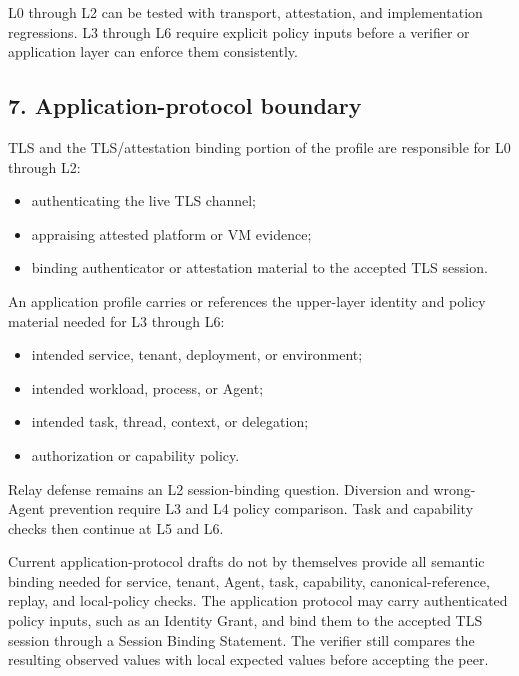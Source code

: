 \documentclass[
]{article}
\providecommand{\tightlist}{%
  \setlength{\itemsep}{0pt}\setlength{\parskip}{0pt}}
\begin{document}
L0 through L2 can be tested with transport, attestation, and
implementation regressions. L3 through L6 require explicit policy inputs
before a verifier or application layer can enforce them consistently.

\subsection{7. Application-protocol
boundary}\label{application-protocol-boundary}

TLS and the TLS/attestation binding portion of the profile are
responsible for L0 through L2:

\begin{itemize}
\tightlist
\item
  authenticating the live TLS channel;
\item
  appraising attested platform or VM evidence;
\item
  binding authenticator or attestation material to the accepted TLS
  session.
\end{itemize}

An application profile carries or references the upper-layer identity
and policy material needed for L3 through L6:

\begin{itemize}
\tightlist
\item
  intended service, tenant, deployment, or environment;
\item
  intended workload, process, or Agent;
\item
  intended task, thread, context, or delegation;
\item
  authorization or capability policy.
\end{itemize}

Relay defense remains an L2 session-binding question. Diversion and
wrong-Agent prevention require L3 and L4 policy comparison. Task and
capability checks then continue at L5 and L6.

Current application-protocol drafts do not by themselves provide all
semantic binding needed for service, tenant, Agent, task, capability,
canonical-reference, replay, and local-policy checks. The application
protocol may carry authenticated policy inputs, such as an Identity
Grant, and bind them to the accepted TLS session through a Session
Binding Statement. The verifier still compares the resulting observed
values with local expected values before accepting the peer.
\end{document}

